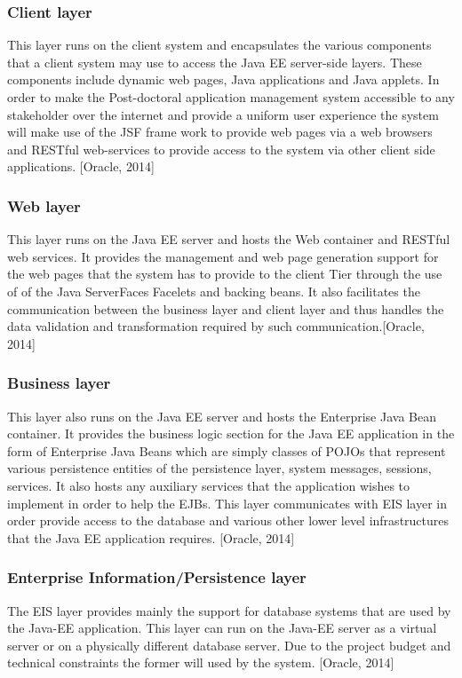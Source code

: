 \documentclass[12pt]{article}
\begin{document}
\subsubsection{Client layer}
This layer runs on the client system and encapsulates the various components that a client system may use to access the Java EE server-side layers. These components include dynamic web pages, Java applications and Java applets. In order to make the Post-doctoral application management system accessible to any stakeholder over the internet and provide a uniform user experience the system will make use of the JSF frame work to provide web pages via a web browsers and RESTful web-services to provide access to the system via other client side applications. [Oracle, 2014]  

\subsubsection{Web layer}
This layer runs on the Java EE server and hosts the Web container and RESTful web services. It provides the management and web page generation support for the web pages that the system has to provide to the client Tier through the use of of the Java ServerFaces Facelets and backing beans. It also facilitates the communication between the business layer and client layer and thus handles the data validation and transformation required by such communication.[Oracle, 2014] 
\subsubsection{Business layer}
This layer also runs on the Java EE server and hosts the Enterprise Java Bean container. It provides the business logic section for the Java EE application in the form of Enterprise Java Beans which are simply classes of POJOs that represent various persistence entities of the persistence layer, system messages, sessions, services. It also hosts any auxiliary services that the application wishes to implement in order to help the EJBs. This layer communicates with EIS layer in order provide access to the database and various other lower level infrastructures that the Java EE application requires. [Oracle, 2014]

\subsubsection{Enterprise Information/Persistence layer} 
The EIS layer provides mainly the support for database systems that are used by the Java-EE application. This layer can run on the Java-EE server as a virtual server or on a physically different database server. Due to the project budget and technical constraints the former will used by the system. [Oracle, 2014] 
\end{document}
